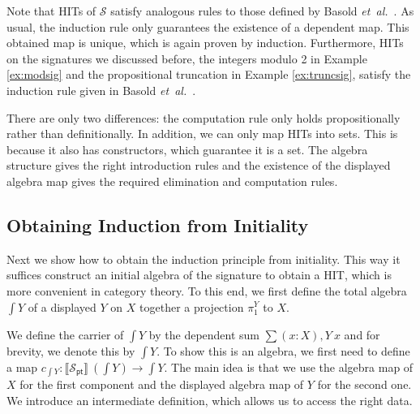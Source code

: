 \documentclass[9pt]{entcs}
\newcommand{\etal}{\emph{et~al.}}
\newcommand{\desum}[3]{\sum(#1 : #2), #3} %
\newcommand{\0}{\textbf{0}} %
\newcommand{\pt}[0]{\textsf{pt}}
\newcommand{\pointc}[1]{#1_{\pt}} %
\newcommand{\sig}{\mathcal{S}} %
\newcommand{\semP}[1]{\llbracket #1 \rrbracket} %
\newcommand{\total}[1]{\int #1} %
\newcommand{\proj}[1]{\pi_1^{#1}} %
\begin{document}
Note that HITs of $\sig$ satisfy analogous rules to those defined by Basold \etal \ \cite{BasoldGW17}.
As usual, the induction rule only guarantees the existence of a dependent map.
This obtained map is unique, which is again proven by induction.
Furthermore, HITs on the signatures we discussed before, the integers modulo 2 in Example \ref{ex:modsig} and the propositional truncation in Example \ref{ex:truncsig}, satisfy the induction rule given in Basold \etal \ \cite{BasoldGW17}.

There are only two differences: the computation rule only holds propositionally rather than definitionally.
In addition, we can only map HITs into sets.
This is because it also has constructors, which guarantee it is a set.
The algebra structure gives the right introduction rules and the existence of the displayed algebra map gives the required elimination and computation rules.

\subsection{Obtaining Induction from Initiality}
Next we show how to obtain the induction principle from initiality.
This way it suffices construct an initial algebra of the signature to obtain a HIT, which is more convenient in category theory.
To this end, we first define the total algebra $\total{Y}$ of a displayed $Y$ on $X$ together a projection $\proj{Y}$ to $X$.

We define the carrier of $\total{Y}$ by the dependent sum $\desum{x}{X}{Y \> x}$ and for brevity, we denote this by $\total{Y}$.
To show this is an algebra, we first need to define a map $c_{\total{Y}} : \semP{\pointc{\sig}} \> (\total{Y}) \rightarrow \total{Y}$.
The main idea is that we use the algebra map of $X$ for the first component and the displayed algebra map of $Y$ for the second one.
We introduce an intermediate definition, which allows us to access the right data.
\end{document}

